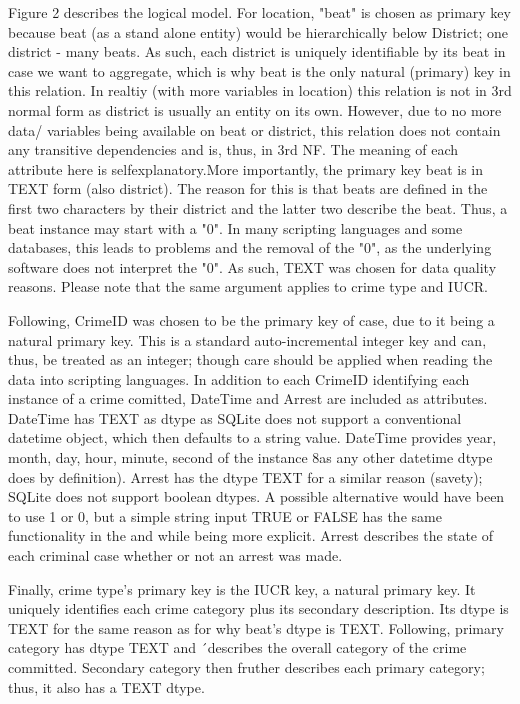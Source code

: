 \documentclass[a4paper]{article}
\begin{document}
Figure 2 describes the logical model. For location, "beat" is chosen as primary key because beat (as a stand alone entity) would be hierarchically below District; one district - many beats. As such, each district is uniquely identifiable by its beat in case we want to aggregate, which is why beat is the only natural (primary) key in this relation. In realtiy (with more variables in location) this relation is not in 3rd normal form as district is usually an entity on its own. However, due to no more data/ variables being available on beat or district, this relation does not contain any transitive dependencies and is, thus, in 3rd NF. The meaning of each attribute here is selfexplanatory.More importantly, the primary key beat is in TEXT form (also district). The reason for this is that beats are defined in the first two characters by their district and the latter two describe the beat. Thus, a beat instance may start with a "0". In many scripting languages and some databases, this leads to problems and the removal of the "0", as the underlying software does not interpret the "0". As such, TEXT was chosen for data quality reasons. Please note that the same argument applies to crime type and IUCR. 

\indent Following, CrimeID was chosen to be the primary key of case, due to it being a natural primary key. This is a standard auto-incremental integer key and can, thus, be treated as an integer; though care should be applied when reading the data into scripting languages. In addition to each CrimeID identifying each instance of a crime comitted, DateTime and Arrest are included as attributes. DateTime has TEXT as dtype as SQLite does not support a conventional datetime object, which then defaults to a string value. DateTime provides year, month, day, hour, minute, second of the instance 8as any other datetime dtype does by definition). Arrest has the dtype TEXT for a similar reason (savety); SQLite does not support boolean dtypes. A possible alternative would have been to use 1 or 0, but a simple string input TRUE or FALSE has the same functionality in the and while being more explicit. Arrest describes the state of each criminal case whether or not an arrest was made. 


\indent Finally, crime type's primary key is the IUCR key, a natural primary key. It uniquely identifies each crime category plus its secondary description. Its dtype is TEXT for the same reason as for why beat's dtype is TEXT. Following, primary category has dtype TEXT and ´describes the overall category of the crime committed. Secondary category then fruther describes each primary category; thus, it also has a TEXT dtype. 
\end{document}
